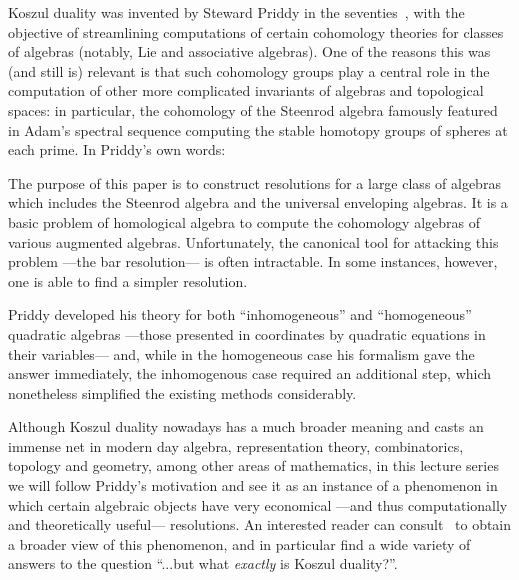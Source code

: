 \documentclass[fleqn, a4paper, twoside]{article}
\makeatletter
\newcommand{\0}{\langle 0\rangle}
\let\[\@undefined
\DeclareRobustCommand{\[}{\begin{equation}}%
\let\]\@undefined
\DeclareRobustCommand{\]}{\end{equation}}%
\theoremstyle{mytheorem}
\theoremstyle{introthm}
\theoremstyle{mydefinition}
\theoremstyle{mydefinition2}
\theoremstyle{plain} %
\newcommand{\?}{\,?\,}
\theoremstyle{mytheorem}
\theoremstyle{plain} %
\newcommand\claim[2][.8]{%
  \begin{minipage}{#1\displaywidth}%
  \itshape
  #2
  \end{minipage}%
}
\makeatother
\begin{document}
Koszul duality was invented by Steward Priddy in
the seventies~\cite{Priddy1970}, with the objective of streamlining
computations of certain cohomology theories for
classes of algebras (notably, Lie and associative 
algebras). One of the reasons this was (and still is)
relevant is that such cohomology groups play a central
role in the computation of other more complicated invariants
of algebras and topological spaces: in particular,
the cohomology of the Steenrod algebra famously featured
in Adam's spectral sequence computing the stable homotopy
groups of spheres at each prime. In Priddy's own words:
\[
\claim{
The purpose of this paper is to construct resolutions for a 
large class of algebras which includes the Steenrod algebra
and the universal enveloping algebras. 
It is a basic problem of homological algebra to compute the 
cohomology algebras of various augmented algebras. Unfortunately, 
the canonical tool for attacking this problem ---the bar resolution--- is often intractable. In some instances,
however, one is able to find a simpler resolution.
}
\]
Priddy developed his theory for both ``inhomogeneous''
and ``homogeneous'' quadratic algebras ---those presented
in coordinates by quadratic equations in their variables---
and, while in the homogeneous case his formalism gave the
answer immediately, the inhomogenous case required an
additional step, which nonetheless simplified the existing
methods considerably.  

Although Koszul duality nowadays has a much broader meaning
and casts an immense net in modern day algebra, representation
theory, combinatorics, topology and geometry, 
among other areas of mathematics, in this lecture
series we will follow Priddy's motivation and see it as an
instance of a phenomenon in which certain algebraic objects
have very economical ---and thus computationally and theoretically
useful--- resolutions. An interested reader can 
consult~\cites{KellerKoszul2003,Positselski2011,
Sinha2010,MO329,holstein2021categorical} to obtain a broader
view of this phenomenon, and in particular find a wide
variety of answers to the question ``...but what \emph{exactly}
is Koszul duality?''.  
%
\end{document}

